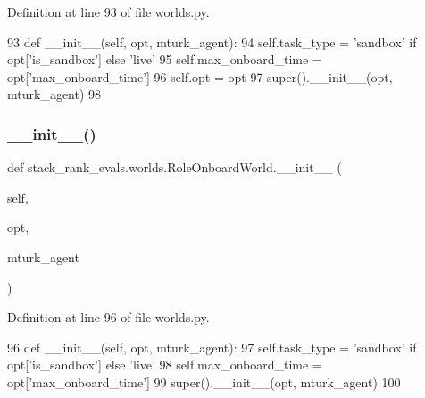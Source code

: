 Definition at line 93 of file worlds.\+py.


\begin{DoxyCode}
93     \textcolor{keyword}{def }\_\_init\_\_(self, opt, mturk\_agent):
94         self.task\_type = \textcolor{stringliteral}{'sandbox'} \textcolor{keywordflow}{if} opt[\textcolor{stringliteral}{'is\_sandbox'}] \textcolor{keywordflow}{else} \textcolor{stringliteral}{'live'}
95         self.max\_onboard\_time = opt[\textcolor{stringliteral}{'max\_onboard\_time'}]
96         self.opt = opt
97         super().\_\_init\_\_(opt, mturk\_agent)
98 
\end{DoxyCode}
\mbox{\label{classstack__rank__evals_1_1worlds_1_1RoleOnboardWorld_a93c85daae3056c33bc77b6159ce43b57}} 
\subsubsection{\texorpdfstring{\+\_\+\+\_\+init\+\_\+\+\_\+()}{\_\_init\_\_()}\hspace{0.1cm}{\footnotesize\ttfamily [2/2]}}
{\footnotesize\ttfamily def stack\+\_\+rank\+\_\+evals.\+worlds.\+Role\+Onboard\+World.\+\_\+\+\_\+init\+\_\+\+\_\+ (\begin{DoxyParamCaption}\item[{}]{self,  }\item[{}]{opt,  }\item[{}]{mturk\+\_\+agent }\end{DoxyParamCaption})}



Definition at line 96 of file worlds.\+py.


\begin{DoxyCode}
96     \textcolor{keyword}{def }\_\_init\_\_(self, opt, mturk\_agent):
97         self.task\_type = \textcolor{stringliteral}{'sandbox'} \textcolor{keywordflow}{if} opt[\textcolor{stringliteral}{'is\_sandbox'}] \textcolor{keywordflow}{else} \textcolor{stringliteral}{'live'}
98         self.max\_onboard\_time = opt[\textcolor{stringliteral}{'max\_onboard\_time'}]
99         super().\_\_init\_\_(opt, mturk\_agent)
100 
\end{DoxyCode}


